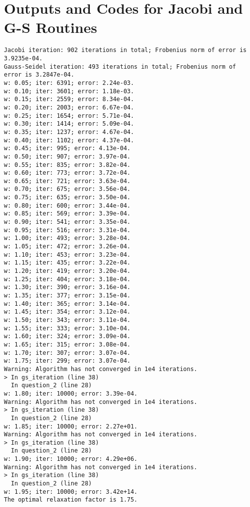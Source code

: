 \documentclass{assignment}[2019/10/15]
\begin{document}
    \section{Outputs and Codes for Jacobi and G-S Routines}\label{appx: q2}

    \begin{lstlisting}[style=MATLAB-editor, basicstyle=\ttfamily\scriptsize, title={Outputs}]
Jacobi iteration: 902 iterations in total; Frobenius norm of error is 3.9235e-04.
Gauss-Seidel iteration: 493 iterations in total; Frobenius norm of error is 3.2847e-04.
w: 0.05; iter: 6391; error: 2.24e-03.
w: 0.10; iter: 3601; error: 1.18e-03.
w: 0.15; iter: 2559; error: 8.34e-04.
w: 0.20; iter: 2003; error: 6.67e-04.
w: 0.25; iter: 1654; error: 5.71e-04.
w: 0.30; iter: 1414; error: 5.09e-04.
w: 0.35; iter: 1237; error: 4.67e-04.
w: 0.40; iter: 1102; error: 4.37e-04.
w: 0.45; iter: 995; error: 4.13e-04.
w: 0.50; iter: 907; error: 3.97e-04.
w: 0.55; iter: 835; error: 3.82e-04.
w: 0.60; iter: 773; error: 3.72e-04.
w: 0.65; iter: 721; error: 3.63e-04.
w: 0.70; iter: 675; error: 3.56e-04.
w: 0.75; iter: 635; error: 3.50e-04.
w: 0.80; iter: 600; error: 3.44e-04.
w: 0.85; iter: 569; error: 3.39e-04.
w: 0.90; iter: 541; error: 3.35e-04.
w: 0.95; iter: 516; error: 3.31e-04.
w: 1.00; iter: 493; error: 3.28e-04.
w: 1.05; iter: 472; error: 3.26e-04.
w: 1.10; iter: 453; error: 3.23e-04.
w: 1.15; iter: 435; error: 3.22e-04.
w: 1.20; iter: 419; error: 3.20e-04.
w: 1.25; iter: 404; error: 3.18e-04.
w: 1.30; iter: 390; error: 3.16e-04.
w: 1.35; iter: 377; error: 3.15e-04.
w: 1.40; iter: 365; error: 3.14e-04.
w: 1.45; iter: 354; error: 3.12e-04.
w: 1.50; iter: 343; error: 3.11e-04.
w: 1.55; iter: 333; error: 3.10e-04.
w: 1.60; iter: 324; error: 3.09e-04.
w: 1.65; iter: 315; error: 3.08e-04.
w: 1.70; iter: 307; error: 3.07e-04.
w: 1.75; iter: 299; error: 3.07e-04.
Warning: Algorithm has not converged in 1e4 iterations.
> In gs_iteration (line 38)
  In question_2 (line 28)
w: 1.80; iter: 10000; error: 3.39e-04.
Warning: Algorithm has not converged in 1e4 iterations.
> In gs_iteration (line 38)
  In question_2 (line 28)
w: 1.85; iter: 10000; error: 2.27e+01.
Warning: Algorithm has not converged in 1e4 iterations.
> In gs_iteration (line 38)
  In question_2 (line 28)
w: 1.90; iter: 10000; error: 4.29e+06.
Warning: Algorithm has not converged in 1e4 iterations.
> In gs_iteration (line 38)
  In question_2 (line 28)
w: 1.95; iter: 10000; error: 3.42e+14.
The optimal relaxation factor is 1.75.
    \end{lstlisting}
\end{document}

